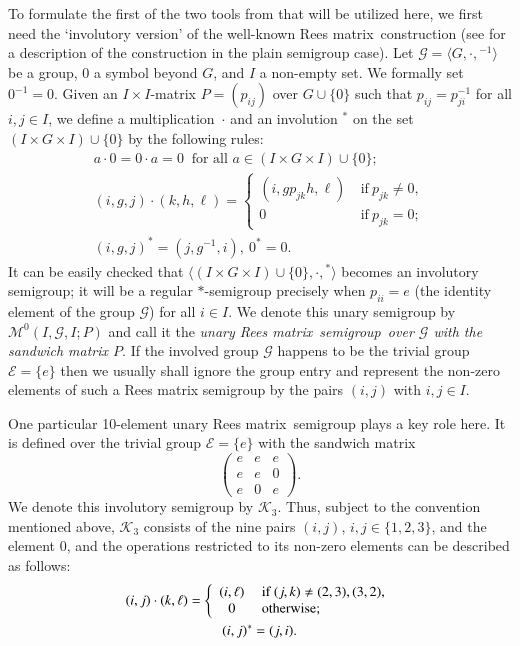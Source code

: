 \documentclass[preprint,1p,times]{elsarticle}
\numberwithin{equation}{section}
\theoremstyle{remark}
\def\cal{\mathcal}
\def\Mc{{\cal M}}
\def\Rm{Rees matrix}
\def\sm{semi\-group}
\begin{document}
To formulate the first of the two tools from \cite{adv} that will be utilized here, we first need the `involutory
version' of the well-known \Rm\ construction (see \cite[Section~3.1]{CP} for a description of the construction in the
plain semigroup case). Let $\mathcal{G}=\langle G,\cdot,{}^{-1}\rangle$ be a group, $0$ a symbol beyond $G$, and $I$ a
non-empty set. We formally set $0^{-1}=0$. Given an $I\times I$-matrix $P=(p_{ij})$ over $G\cup\{0\}$ such that
$p_{ij}=p_{ji}^{-1}$ for all $i,j\in I$, we define a multiplication~$\cdot$ and an involution ${}^*$ on the set
$(I\times G\times I)\cup\{0\}$ by the following rules:
\begin{gather*}
a\cdot 0=0\cdot a=0\ \text{ for all $a\in (I\times G\times I)\cup \{0\}$};\\
(i,g,j)\cdot(k,h,\ell)=\left\{\begin{array}{cl}
(i,gp_{jk}h,\ell)&\ \text{if}\ p_{jk}\ne0,\\
0 &\ \text{if}\ p_{jk}=0;
\end{array}\right.\\
(i,g,j)^* = (j,g^{-1},i),\ 0^* = 0.
\end{gather*}
It can be easily checked that $\langle(I\times G\times I)\cup \{0\},\cdot,{}^*\rangle$ becomes  an involutory
semigroup; it will be a regular $*$-semigroup precisely when $p_{ii}=e$ (the identity element of the group
$\mathcal{G}$) for all $i\in I$. We denote this unary semigroup  by $\Mc^0(I,\mathcal{G},I;P)$ and call it the
\emph{unary \Rm\ \sm\ over $\mathcal{G}$ with the sandwich matrix $P$}. If the involved group $\mathcal G$ happens to
be the trivial group $\mathcal{E}=\{e\}$ then we usually shall ignore the group entry and represent the non-zero
elements of such a Rees matrix semigroup by the pairs $(i,j)$ with $i,j\in I$.

One particular 10-element unary \Rm\ semigroup plays a key role here. It is defined over the trivial group
$\mathcal{E}=\{e\}$ with the sandwich matrix
$$\begin{pmatrix}
e & e & e\\
e & e & 0\\
e & 0 & e
\end{pmatrix}.$$
We denote this involutory semigroup by $\mathcal{K}_3$. Thus, subject to the convention mentioned above,
$\mathcal{K}_3$ consists of the nine pairs $(i,j)$, $i,j\in\{1,2,3\}$, and the element $0$, and the operations
restricted to its non-zero elements can be described as follows:
\begin{gather}
\label{operations in C3} (i,j)\cdot(k,\ell)=\left\{\begin{array}{cl}
(i,\ell)&\ \text{if}\ (j,k)\ne(2,3),(3,2),\\
0 &\ \text{otherwise};
\end{array}\right.\\
(i,j)^* = (j,i)\notag.
\end{gather}
\end{document}
